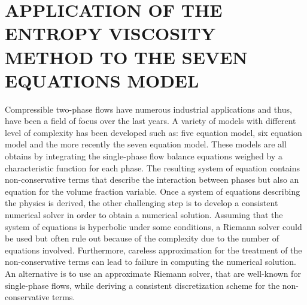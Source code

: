 %
%
%


\chapter{\uppercase {Application of the entropy viscosity method to the seven equations model}}\label{chap:seven}
%
Compressible two-phase flows have numerous industrial applications and thus, have been a field of focus over the last years. A variety of models with different level of complexity has been developed such as: five equation model, six equation model and the more recently the seven equation model. These models are all obtains by integrating the single-phase flow balance equations weighed by a characteristic function for each phase. The resulting system of equation contains non-conservative terms that describe the interaction between phases but also an equation for the volume fraction variable. Once a system of equations describing the physics is derived, the other challenging step is to develop a consistent numerical solver in order to obtain a numerical solution. Assuming that the system of equations is hyperbolic under some conditions, a Riemann solver could be used but often rule out because of the complexity due to the number of equations involved. Furthermore, careless approximation for the treatment of the non-conservative terms can lead to failure in computing the numerical solution. An alternative is to use an approximate Riemann solver, that are well-known for single-phase flows, while deriving a consistent discretization scheme for the non-conservative terms. 

